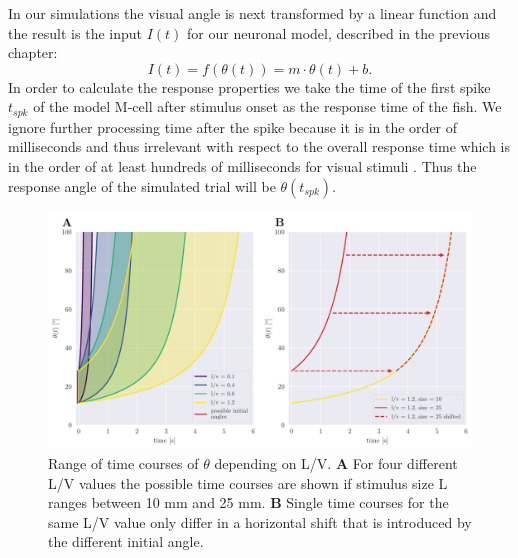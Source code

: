 \documentclass[a4paper,10pt,hidelinks]{scrreprt}
\begin{document}
	In our simulations the visual angle is next transformed by a linear function and the result is the input $I(t)$ for our neuronal model, described in the previous chapter:
	\begin{equation}
	I(t) = f(\theta (t)) = m \cdot \theta(t) + b.
	\label{eq:input}
	\end{equation}
	In order to calculate the response properties we take the time of the first spike $t_{spk}$ of the model M-cell after stimulus onset as the response time of the fish.
	We ignore further processing time after the spike because it is in the order of milliseconds \citep{Preuss2003} and thus irrelevant with respect to the overall response time which is in the order of at least hundreds of milliseconds for visual stimuli \citep{Preuss2006}.
	Thus the response angle of the simulated trial will be $\theta (t_{spk})$.
	
    \begin{figure}[!h]
    	\begin{center}
			\includegraphics[width=\textwidth]{figure_theta_lv_test.pdf}
    	\end{center}
    	\caption{Range of time courses of $\theta$ depending on L/V. \textbf{A} For four different L/V values the possible time courses are shown if stimulus size L ranges between 10 mm and 25 mm. \textbf{B} Single time courses for the same L/V value only differ in a horizontal shift that is introduced by the different initial angle.}
    	\label{fig:theta_lv}
    \end{figure}
    
\end{document}
